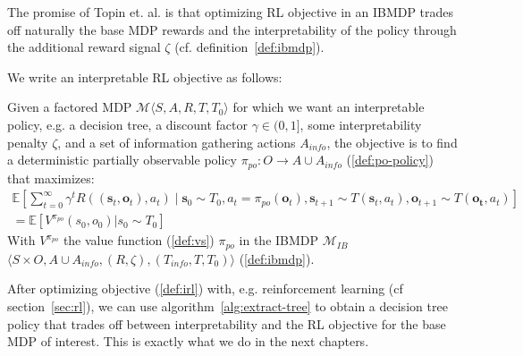 The promise of Topin et. al. is that optimizing RL objective in an IBMDP trades off naturally the base MDP rewards and the interpretability of the policy through the additional reward signal $\zeta$ (cf. definition~\ref{def:ibmdp}).

We write an interpretable RL objective as follows:
\begin{definition}\label{def:irl}
    Given a factored MDP $\mathcal{M} \langle S, A, R, T, T_0 \rangle$ for which we want an interpretable policy, e.g. a decision tree, a discount factor $\gamma \in (0,1]$, some interpretability penalty $\zeta$, and a set of information gathering actions $A_{info}$, the objective is to find a deterministic partially observable policy $\pi_{po}: O \rightarrow A\cup A_{info}$ (\ref{def:po-policy}) that maximizes:
\begin{align*}
    \mathbb{E}\left[\sum_{t=0}^{\infty} \gamma^t R((\boldsymbol{s}_t, \boldsymbol{o}_t), a_t) \mid \boldsymbol{s}_0 \sim T_0, a_t = \pi_{po}(\boldsymbol{o}_t), \boldsymbol{s}_{t+1} \sim T(\boldsymbol{s}_t, a_t), \boldsymbol{o}_{t+1}\sim T(\boldsymbol{o_t}, a_t)\right]\\
    = \mathbb{E}[V^{\pi_{po}}(s_0, o_0)| s_0\sim T_0]
\end{align*}
With $V^{\pi_{po}}$ the value function (\ref{def:vs}) $\pi_{po}$ in the IBMDP $\mathcal{M}_{IB}$ $\langle S \times O,A \cup A_{info}, (R, \zeta), (T_{info}, T, T_0)\rangle$ (\ref{def:ibmdp}).
\end{definition}

After optimizing objective (\ref{def:irl}) with, e.g. reinforcement learning (cf section~\ref{sec:rl}), we can use algorithm~\ref{alg:extract-tree} to obtain a decision tree policy that trades off between interpretability and the RL objective for the base MDP of interest.
This is exactly what we do in the next chapters.
        
        
